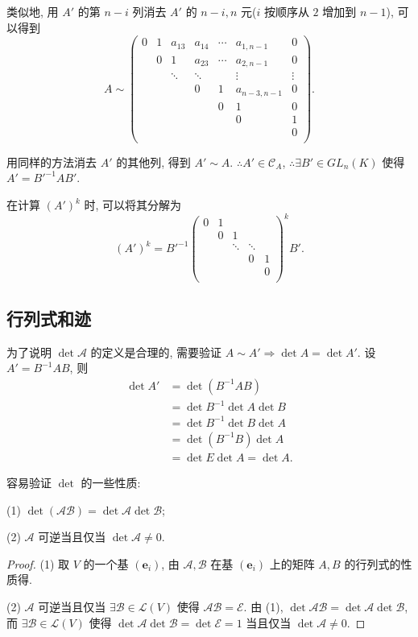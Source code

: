 \documentclass[color=black,device=normal,lang=cn,mode=geye]{elegantnote}
\begin{document}
\begin{example}
    类似地, 用 $A'$ 的第 $n-i$ 列消去 $A'$ 的 $n-i,n$ 元($i$ 按顺序从 $2$ 增加到 $n-1$), 可以得到
    \[A\sim\begin{pmatrix}
        0 & 1 & a_{13} & a_{14} & \cdots & a_{1,n-1} & 0 \\
        & 0 & 1 & a_{23} & \cdots & a_{2,n-1} & 0 \\
        && \ddots & \ddots && \vdots & \vdots \\
        &&& 0 & 1 & a_{n-3,n-1} & 0 \\
        &&&& 0 & 1 & 0 \\
        &&&&& 0 & 1 \\
        &&&&&& 0 \\
    \end{pmatrix}.\]

    用同样的方法消去 $A'$ 的其他列, 得到 $A'\sim A$. $\therefore A'\in\mathcal{C}_A$, $\therefore\exists B'\in GL_n(K)$ 使得 $A'=B'^{-1}AB'$.

    在计算 $(A')^k$ 时, 可以将其分解为
    \[(A')^k=B'^{-1}\begin{pmatrix}
        0 & 1 \\
        & 0 & 1 \\
        && \ddots & \ddots \\
        &&& 0 & 1 \\
        &&&& 0 \\
    \end{pmatrix}^kB'.\]
\end{example}
\subsection{行列式和迹}
为了说明 $\det\mathcal{A}$ 的定义是合理的, 需要验证 $A\sim A'\Rightarrow\det A=\det A'$. 设 $A'=B^{-1}AB$, 则
\begin{align*}
    \det A' & =\det(B^{-1}AB) \\
    & =\det B^{-1}\det A\det B \\
    & =\det B^{-1}\det B\det A \\
    & =\det(B^{-1}B)\det A \\
    & =\det E\det A=\det A.
\end{align*}

容易验证 $\det$ 的一些性质:
\begin{property}
    (1) $\det(\mathcal{AB})=\det\mathcal{A}\det\mathcal{B}$;

    (2) $\mathcal{A}$ 可逆当且仅当 $\det\mathcal{A}\neq0$.
\end{property}
\begin{proof}
    (1) 取 $V$ 的一个基 $(\boldsymbol{e}_i)$, 由 $\mathcal{A},\mathcal{B}$ 在基 $(\boldsymbol{e}_i)$ 上的矩阵 $A,B$ 的行列式的性质得.

    (2) $\mathcal{A}$ 可逆当且仅当 $\exists\mathcal{B}\in\mathcal{L}(V)$ 使得 $\mathcal{AB}=\mathcal{E}$. 由 (1), $\det\mathcal{AB}=\det\mathcal{A}\det\mathcal{B}$, 而 $\exists\mathcal{B}\in\mathcal{L}(V)$ 使得 $\det\mathcal{A}\det\mathcal{B}=\det\mathcal{E}=1$ 当且仅当 $\det\mathcal{A}\neq0$.
\end{proof}
\end{document}
